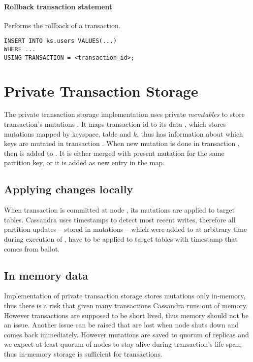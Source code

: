 \paragraph{Rollback transaction statement} 
Performs the rollback of a transaction. 


\begin{lstlisting}[style=outcode,label={lst:insertUsingTx},caption={Insert statement with using transactional clause}]
INSERT INTO ks.users VALUES(...) 
WHERE ...
USING TRANSACTION = <transaction_id>;
\end{lstlisting}


\section{Private Transaction Storage}
The private transaction storage implementation uses private \emph{memtables} to store transaction's mutations \mutations. It maps transaction id to its data , which stores mutations mapped by keyspace, table and $k$, thus \txStorage has information about which keys are mutated in transaction \transaction. 
When new mutation  is done in transaction \transaction, then  is added to . 
It is either merged with present mutation for the same partition key, or it is added as new entry in the map.


\subsection{Applying changes locally}
When transaction \transaction is committed at node , its mutations are applied to target tables.
Cassandra uses timestamps to detect most recent writes, therefore all partition updates -- stored in mutations -- 
which were added to \txStorage at arbitrary time during execution of \transaction, have to be applied to target tables with timestamp that comes from \paxos ballot.



\subsection{In memory data}
Implementation of private transaction storage \txStorage stores mutations \mutations only in-memory, thus there is a risk that given many transactions Cassandra runs out of memory. However transactions are supposed to be short lived, thus memory should not be an issue.
Another issue can be raised that \mutations are lost when node shuts down and comes back immediately. 
However mutations are saved to quorum of replicas and we expect at least quorum of nodes to stay alive during transaction’s life span, thus in-memory storage is sufficient for transactions.


